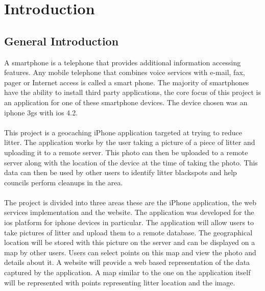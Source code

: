 \documentclass[12pt]{article}
\begin{document}
\newpage


\tableofcontents
\newpage



\section{Introduction}
\paragraph{}


\subsection{General Introduction}

A smartphone is a telephone that provides additional information accessing features. Any mobile telephone that combines voice services with e-mail, fax, pager or Internet access is called a smart phone. The majority of smartphones have the ability to install third party applications, the core focus of this project is an application for one of these smartphone devices. The device chosen was an \gls{iphone} \gls{3gs} with \gls{ios} 4.2.

\paragraph{}


This project is a \gls{geocaching} iPhone application targeted at trying to reduce litter. The application works by the user taking a picture of a piece of litter and uploading it to a remote server.
This photo can then be uploaded to a remote server along with the location of the device at the time of taking the photo. This data can then be used by other users to identify litter blackspots and help councils perform cleanups in the area.

\paragraph{}


The project is divided into three areas these are the iPhone application, the web services implementation and the website. The application was developed for the \gls{ios} platform for \gls{iphone} devices in particular. The application will allow users to take pictures of litter and upload them to a remote database. The geographical location will be stored with this picture on the server and can be displayed on a map by other users. Users can select points on this map and view the photo and details about it. A website will provide a web based  representation of the data captured by the application. A map similar to the one on the application itself will be represented with points representing litter location and the image.
\end{document}
